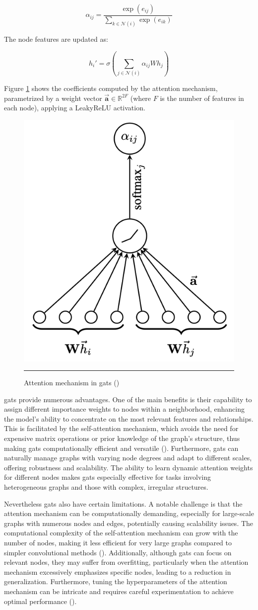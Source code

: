 \[ \alpha_{ij} = \frac{\exp(e_{ij})}{\sum_{k \in \mathcal{N}(i)} \exp(e_{ik})} \]

The node features are updated as:

\[ h_i' = \sigma\left(\sum_{j \in \mathcal{N}(i)} \alpha_{ij} W h_j\right) \]

Figure \ref{fig:gat-attention-mechanism} shows the coefficients computed by the attention mechanism, parametrized by a weight vector $\vec{\mathbf{a}} \in \mathbb{R}^{2F}$ (where $F$ is the number of features in each node), applying a LeakyReLU activation.
\begin{figure}[htbp]
    \centering
 \includegraphics[width=.3\textwidth]{03_Figures/literature-review/gat-attention-mechanism.png}
     \rule{35em}{0.5pt}
    \caption{Attention mechanism in \glspl{gat} (\cite{Velickovic2018})} 
 \label{fig:gat-attention-mechanism}
\end{figure}


\glspl{gat} provide numerous advantages.
One of the main benefits is their capability to assign different importance weights to nodes within a neighborhood, enhancing the model's ability to concentrate on the most relevant features and relationships.
This is facilitated by the self-attention mechanism, which avoids the need for expensive matrix operations or prior knowledge of the graph's structure, thus making \glspl{gat} computationally efficient and versatile (\cite{Velickovic2018}).
Furthermore, \glspl{gat} can naturally manage graphs with varying node degrees and adapt to different scales, offering robustness and scalability.
The ability to learn dynamic attention weights for different nodes makes \glspl{gat} especially effective for tasks involving heterogeneous graphs and those with complex, irregular structures.

Nevertheless \glspl{gat} also have certain limitations.
A notable challenge is that the attention mechanism can be computationally demanding, especially for large-scale graphs with numerous nodes and edges, potentially causing scalability issues.
The computational complexity of the self-attention mechanism can grow with the number of nodes, making it less efficient for very large graphs compared to simpler convolutional methods (\cite{Thekumparampil2018}).
Additionally, although \glspl{gat} can focus on relevant nodes, they may suffer from overfitting, particularly when the attention mechanism excessively emphasizes specific nodes, leading to a reduction in generalization.
Furthermore, tuning the hyperparameters of the attention mechanism can be intricate and requires careful experimentation to achieve optimal performance (\cite{Lee2018}).

